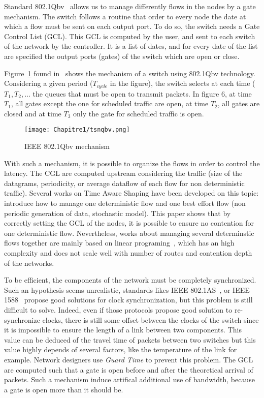 Standard 802.1Qbv~\cite{8613095} allows us to manage differently flows in the nodes by a gate mechanism. The switch follows a routine that order to every node the date at which a flow must be sent on each output port. To do so, the switch needs a Gate Control List (GCL). This GCL is computed by the user, and sent to each switch of the network by the controller. It is a list of dates, and for every date of the list are specified the output ports (gates) of the switch which are open or close.


Figure~\ref{fig:tsnqbv} found in~\cite{durr2016no} shows the mechanism of a switch using 802.1Qbv technology. Considering a given period ($T_{cycle}$ in the figure), the switch selects at each time ($T_1 , T_2 , \ldots$ the queues that must be open to transmit packets. In figure 6, at time $T_1$, all gates except the one for scheduled traffic are open, at time $T_2$, all gates are closed and at time $T_3$ only the gate for scheduled traffic is open.

  \begin{figure}
  \begin{center}
  \texttt{[image: Chapitre1/tsnqbv.png]}
  \end{center}
  \caption{IEEE 802.1Qbv mechanism}\label{fig:tsnqbv}
  \end{figure}
      
With such a mechanism, it is possible to organize the flows in order to control the latency. The CGL are computed upstream considering the traffic (size of the datagrams, periodicity, or average dataflow of each flow for non deterministic traffic). Several works on Time Aware Shaping have been developed on this topic: \cite{al2017modeling} introduce how to manage one deterministic flow and one best effort flow (non periodic generation of data, stochastic model). This paper shows that by correctly setting the GCL of the nodes, it is possible to ensure no contention for one deterministic flow. Nevertheless, works about managing several determinstic flows together are mainly based on linear programing~\cite{steiner2018traffic,silviu2017,nayak2017incremental,naresh2016}, which has an high complexity and does not scale well with number of routes and contention depth of the networks.


To be efficient, the components of the network must be completely synchronized. Such an hypothesis seems unrealistic, standards likes IEEE 802.1AS~\cite{5741898}, or IEEE 1588~\cite{4579760} propose good solutions for clock synchronization, but this problem is still difficult to solve. Indeed, even if those protocols propose good solution to re-synchronize clocks, there is still some offset between the clocks of the switch since it is impossible to ensure the length of a link between two components. This value can be deduced of the travel time of packets between two switches but this value highly depends of several factors, like the temperature of the link for example. Network designers use {\em Guard Time} to prevent this problem. The GCL are computed such that a gate is open before and after the theoretical arrival of packets. Such a mechanism induce artifical additional use of bandwidth, because a gate is open more than it should be.

